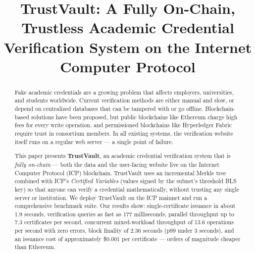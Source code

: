 \documentclass[conference]{IEEEtran}
\begin{document}
\title{TrustVault: A Fully On-Chain, Trustless Academic Credential Verification System on the Internet Computer Protocol}

\author{
  \and
}



\maketitle

\begin{abstract}
Fake academic credentials are a growing problem that affects employers, universities, and students worldwide. Current verification methods are either manual and slow, or depend on centralized databases that can be tampered with or go offline. Blockchain-based solutions have been proposed, but public blockchains like Ethereum charge high fees for every write operation, and permissioned blockchains like Hyperledger Fabric require trust in consortium members. In all existing systems, the verification website itself runs on a regular web server — a single point of failure.

This paper presents \textbf{TrustVault}, an academic credential verification system that is \emph{fully on-chain} — both the data and the user-facing website live on the Internet Computer Protocol (ICP) blockchain. TrustVault uses an incremental Merkle tree combined with ICP's \emph{Certified Variables} (values signed by the subnet's threshold BLS key) so that anyone can verify a credential mathematically, without trusting any single server or institution. We deploy TrustVault on the ICP mainnet and run a comprehensive benchmark suite. Our results show: single-certificate issuance in about 1.9 seconds, verification queries as fast as 177 milliseconds, parallel throughput up to 7.3 certificates per second, concurrent mixed-workload throughput of 13.6 operations per second with zero errors, block finality of 2.36 seconds (p99 under 3 seconds), and an issuance cost of approximately \$0.001 per certificate — orders of magnitude cheaper than Ethereum.
\end{abstract}
\end{document}
